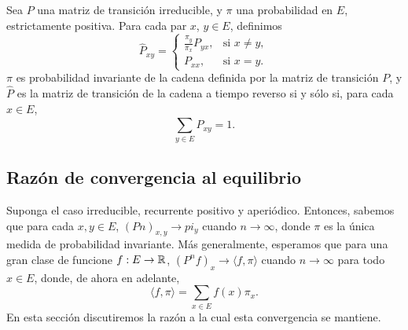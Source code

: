 \begin{prop}
Sea $P$ una matriz de transición irreducible, y $\pi$ una probabilidad en $E$, estrictamente positiva. Para cada par $x$, $y\in E$, definimos
\[\hat{P}_{xy}= \begin{cases}
                \frac{\pi_y}{\pi_x}P_{yx}, & \text{si }x\neq y,\\
                P_{xx}, & \text{si }x=y.
                \end{cases}\]
$\pi$ es probabilidad invariante de la cadena definida por la matriz de transición $P$, y $\hat{P}$ es la matriz de transición de la cadena a tiempo reverso si y sólo si, para cada $x\in E$,
\[\sum_{y\in E} \hat{P}_{xy} = 1.\]
\end{prop}

\subsection{Razón de convergencia al equilibrio}
Suponga el caso irreducible, recurrente positivo y aperiódico. Entonces, sabemos que para cada $x,y \in E$, $(Pn)_{x,y}\rightarrow pi_y$ cuando $n\rightarrow \infty$, donde $\pi$ es la única medida de probabilidad invariante. Más generalmente, esperamos que para una gran clase de funcione $f:E\rightarrow \mathbb R$, $(P^nf)_{x}\rightarrow \langle f,\pi \rangle$ cuando $n\rightarrow \infty$ para todo $x\in E$, donde, de ahora en adelante,
\[\langle f,\pi \rangle = \sum_{x\in E}f(x)\pi_x.\]
En esta sección discutiremos la razón a la cual esta convergencia se mantiene.

